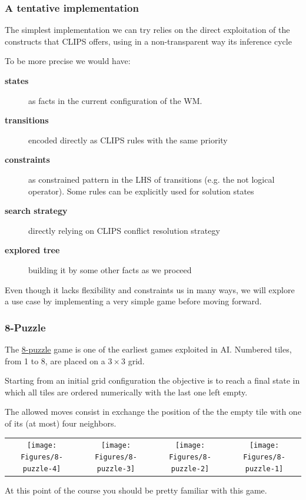\documentclass[xcolor={usenames,dvipsnames,svgnames}, compress]{beamer}
\begin{document}
\begin{frame}
  \frametitle{A tentative implementation}
  The simplest implementation we can try relies on the direct
  exploitation of the constructs that CLIPS offers, using in a
  non-transparent way its inference cycle\par\bigskip
  To be more precise we would have:
  \begin{description}
  \item[\textbf{states}] as facts in the current configuration of the WM.
  \item[\textbf{transitions}] encoded directly as CLIPS rules with the
    same priority
  \item[\textbf{constraints}] as constrained pattern in the LHS of
    transitions (e.g. the \textsf{not} logical operator). Some rules
    can be explicitly used for solution states
  \item[\textbf{search strategy}] directly relying on CLIPS conflict
    resolution strategy
  \item[\textbf{explored tree}] building it by some other facts as we
    proceed
  \end{description}
  Even though it lacks flexibility and constraints us in many ways, we
  will explore a use case by implementing a very simple game before moving forward. 
\end{frame}
\begin{frame}
  \frametitle{8-Puzzle}
  The \href{http://en.wikipedia.org/wiki/15_puzzle}{8-puzzle} game is
  one of the earliest games exploited in AI. Numbered tiles, from 1 to
  8, are placed on a $3\times3$ grid.\par Starting from an initial grid
  configuration the objective is to reach a final state in which all
  tiles are ordered numerically with the last one left empty.\par
  The allowed moves consist in exchange the position of the the empty
  tile with one of its (at most) four neighbors.
  \begin{table}
    \setlength\tabcolsep{2pt}
    \centering
    \tiny
    \begin{tabular}{c c c c }
      \texttt{[image: Figures/8-puzzle-4]}
      & \texttt{[image: Figures/8-puzzle-3]}
      & \texttt{[image: Figures/8-puzzle-2]}
      & \texttt{[image: Figures/8-puzzle-1]}\\
    \end{tabular}
  \end{table}
  At this point of the course you should be pretty familiar with this game.
\end{frame}
\end{document}
